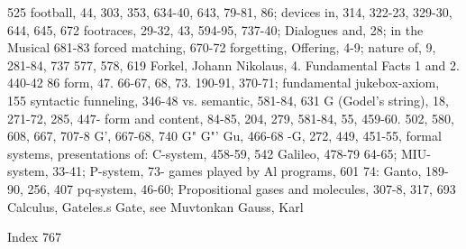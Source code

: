 525 football, 44, 303, 353, 634-40, 643,          79-81, 86; devices in, 314, 322-23, 329-30,
644, 645, 672 footraces, 29-32, 43, 594-95,       737-40; Dialogues and, 28; in the Musical
681-83 forced matching, 670-72 forgetting,        Offering, 4-9; nature of, 9, 281-84, 737
577, 578, 619 Forkel, Johann Nikolaus, 4.         Fundamental Facts 1 and 2. 440-42
86 form, 47. 66-67, 68, 73. 190-91, 370-71;       fundamental        jukebox-axiom,       155
syntactic                                         funneling, 346-48
vs. semantic, 581-84, 631                         G (Godel's string), 18, 271-72, 285, 447-
form and content, 84-85, 204, 279, 581-84,        55, 459-60. 502, 580, 608, 667, 707-8 G',
667-68, 740                                       G" G"' Gu, 466-68 -G, 272, 449, 451-55,
formal systems, presentations of: C-system,       458-59, 542 Galileo, 478-79
64-65; MIU-system, 33-41; P-system, 73-           games played by Al programs, 601
74:                                               Ganto, 189-90, 256, 407
pq-system, 46-60;       Propositional             gases and molecules, 307-8, 317, 693
         Calculus,                                Gateles.s Gate, see Muvtonkan Gauss, Karl



Index                                                                                    767

